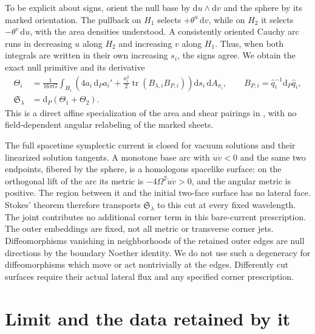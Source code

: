 \documentclass[11pt]{article}
\newcommand{\tr}{\operatorname{tr}}
\newcommand{\dd}{\mathrm d}
\begin{document}
To be explicit about signs, orient the null base by
\(\dd u\wedge\dd v\) and the sphere by its marked
orientation. The pullback on \(H_1\) selects
\(+\theta^u\,\dd v\), while on \(H_2\) it selects
\(-\theta^v\,\dd u\), with the area densities understood.
A consistently oriented Cauchy arc runs in decreasing
\(u\) along \(H_2\) and increasing \(v\) along \(H_1\).
Thus, when both integrals are written in their own
increasing \(s_i\), the signs agree. We obtain the exact
null primitive and its derivative
\begin{align}
 \Theta_i
 &=\frac{1}{16\pi G}\int_{H_i}
 \left(4a_i\,\dd_{\!P}a_i'
   +\frac{a_i^2}{2}\tr(B_{\lambda,i}B_{P,i})\right)
   \dd s_i\,\dd A_{\sigma_i},
 \qquad
 B_{P,i}=\widehat q_i^{-1}\dd_{\!P}\widehat q_i ,
 \label{eq:primitive}\\
 \mathfrak S_\lambda&=\dd_{\!P}(\Theta_1+\Theta_2).
 \nonumber
\end{align}
This is a direct affine specialization of the
area and shear pairings in \cite{Reisenberger,HF},
with no field-dependent angular relabeling of the
marked sheets.

The full spacetime symplectic current is closed for
vacuum solutions and their linearized solution tangents.
A monotone base arc with \(\dot u\dot v<0\) and the same
two endpoints, fibered by the sphere, is a homologous
spacelike surface: on the orthogonal lift of the arc its
metric is \(-4\Omega^2\dot u\dot v>0\), and the angular
metric is positive. The region between it and the initial
two-face surface has no lateral face. Stokes' theorem
therefore transports \(\mathfrak S_\lambda\) to this cut
at every fixed wavelength. The joint contributes no
additional corner term in this bare-current prescription.
The outer embeddings are fixed, not all metric or
transverse corner jets. Diffeomorphisms vanishing in
neighborhoods of the retained outer edges are null
directions by the boundary Noether identity. We do not
use such a degeneracy for diffeomorphisms which move or
act nontrivially at the edges. Differently cut surfaces
require their actual lateral flux and any specified
corner prescription.

\section{Limit and the data retained by it}\label{sec:limit}
\end{document}
